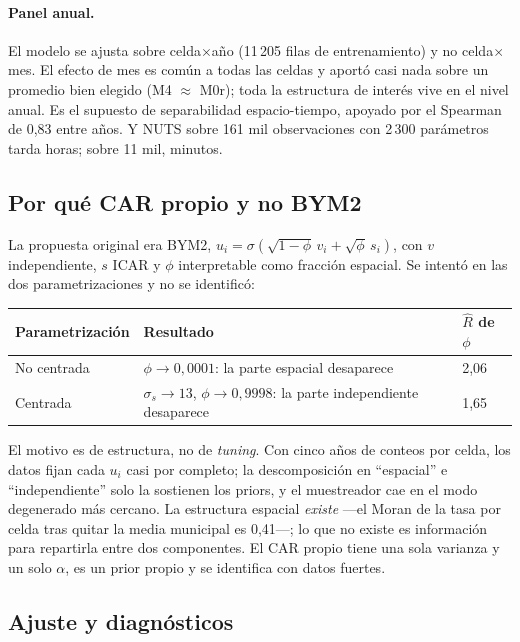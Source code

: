 \documentclass[11pt,a4paper]{article}
\newcommand{\Rhat}{\hat{R}}
\begin{document}
\paragraph{Panel anual.} El modelo se ajusta sobre celda$\times$año (11\,205
filas de entrenamiento) y no celda$\times$mes. El efecto de mes es común a
todas las celdas y aportó casi nada sobre un promedio bien elegido (M4 $\approx$
M0r); toda la estructura de interés vive en el nivel anual. Es el supuesto de
separabilidad espacio-tiempo, apoyado por el Spearman de 0,83 entre años. Y
NUTS sobre 161 mil observaciones con 2\,300 parámetros tarda horas; sobre 11
mil, minutos.

\subsection{Por qué CAR propio y no BYM2}

La propuesta original era BYM2, $u_i = \sigma(\sqrt{1-\phi}\,v_i + \sqrt{\phi}\,s_i)$,
con $v$ independiente, $s$ ICAR y $\phi$ interpretable como fracción
espacial. Se intentó en las dos parametrizaciones y no se identificó:

\begin{table}[H]
\centering\small
\begin{tabular}{lll}
\toprule
Parametrización & Resultado & $\Rhat$ de $\phi$ \\
\midrule
No centrada & $\phi \to 0{,}0001$: la parte espacial desaparece & 2,06 \\
Centrada    & $\sigma_s \to 13$, $\phi \to 0{,}9998$: la parte independiente desaparece & 1,65 \\
\bottomrule
\end{tabular}
\end{table}

El motivo es de estructura, no de \emph{tuning}. Con cinco años de conteos por
celda, los datos fijan cada $u_i$ casi por completo; la descomposición en
``espacial'' e ``independiente'' solo la sostienen los priors, y el muestreador
cae en el modo degenerado más cercano. La estructura espacial \emph{existe}
—el Moran de la tasa por celda tras quitar la media municipal es 0,41—; lo
que no existe es información para repartirla entre dos componentes. El CAR
propio tiene una sola varianza y un solo $\alpha$, es un prior propio y se
identifica con datos fuertes.

\subsection{Ajuste y diagnósticos}
\end{document}
